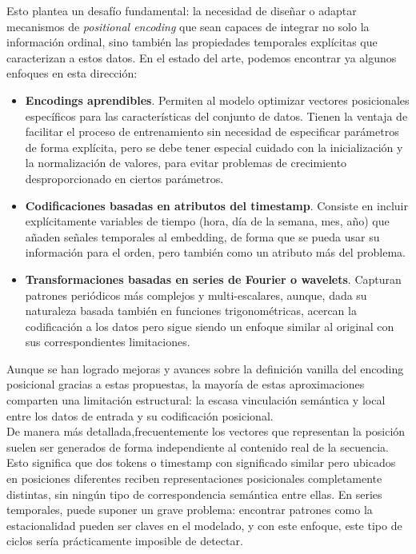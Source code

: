 Esto plantea un desafío fundamental: la necesidad de diseñar o adaptar mecanismos de \textit{positional encoding} que sean capaces de integrar no solo la información ordinal, sino también las propiedades temporales explícitas que caracterizan a estos datos. En el estado del arte, podemos encontrar ya algunos enfoques en esta dirección:

\begin{itemize}
	\item \textbf{Encodings aprendibles}. Permiten al modelo optimizar vectores posicionales específicos para las características del conjunto de datos. Tienen la ventaja de facilitar el proceso de entrenamiento sin necesidad de especificar parámetros de forma explícita, pero se debe tener especial cuidado con la inicialización y la normalización de valores, para evitar problemas de crecimiento desproporcionado en ciertos parámetros.
	\item \textbf{Codificaciones basadas en atributos del timestamp}. Consiste en incluir explícitamente variables de tiempo (hora, día de la semana, mes, año) que añaden señales temporales al embedding, de forma que se pueda usar su información para el orden, pero también como un atributo más del problema.
	\item \textbf{Transformaciones basadas en series de Fourier o wavelets}. Capturan patrones periódicos más complejos y multi-escalares, aunque, dada su naturaleza basada también en funciones trigonométricas, acercan la codificación a los datos pero sigue siendo un enfoque similar al original con sus correspondientes limitaciones.
\end{itemize}

Aunque se han logrado mejoras y avances sobre la definición vanilla del encoding posicional gracias a estas propuestas, la mayoría de estas aproximaciones comparten una limitación estructural: la escasa vinculación semántica y local entre los datos de entrada y su codificación posicional.\\

De manera más detallada,frecuentemente los vectores que representan la posición suelen ser generados de forma independiente al contenido real de la secuencia. Esto significa que dos tokens o timestamp con significado similar pero ubicados en posiciones diferentes reciben representaciones posicionales completamente distintas, sin ningún tipo de correspondencia semántica entre ellas. En series temporales, puede suponer un grave problema: encontrar patrones como la estacionalidad pueden ser claves en el modelado, y con este enfoque, este tipo de ciclos sería prácticamente imposible de detectar.\\

